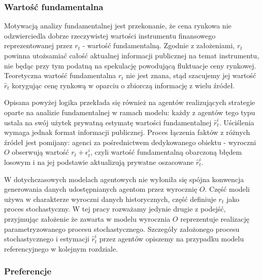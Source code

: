 {\subsubsection{Wartość fundamentalna}
Motywacją analizy fundamentalnej jest przekonanie, że cena rynkowa nie odzwierciedla dobrze rzeczywistej wartości instrumentu finansowego reprezentowanej przez $r_t$ - wartość fundamentalną. Zgodnie z założeniami, $r_t$ powinna utożsamiać całość aktualnej informacji publicznej na temat instrumentu, nie będąc przy tym podatną na spekulację powodującą fluktuacje ceny rynkowej. Teoretyczna wartość fundamentalna $r_t$ nie jest znana, stąd szacujemy jej wartość $\hat{r}_t$ korygując cenę rynkową w oparciu o zbiorczą informację z wielu źródeł.

Opisana powyżej logika przekłada się również na agentów realizujących strategie oparte na analizie fundamentalnej w ramach modelu: każdy z agentów tego typu ustala na swój użytek prywatną estymatę wartości fundamentalnej $\hat{r}^i_t$. Uściślenia wymaga jednak format informacji publicznej. Proces łączenia faktów z różnych źródeł jest pomijany: agenci za pośrednictwem dedykowanego obiektu - wyroczni $O$ obserwują wartość $r_t + \epsilon^i_t$, czyli wartość fundamentalną obarczoną błędem losowym i na jej podstawie aktualizują prywatne oszacowane $\hat{r}^i_t$.

W dotychczasowych modelach agentowych nie wyłoniła się spójna konwencja generowania danych udostępnianych agentom przez wyrocznię $O$. Część modeli używa w charakterze wyroczni danych historycznych, część definiuje $r_t$ jako proces stochastyczny. W tej pracy rozważamy jedynie drugie z podejść, przyjmując założenie że zawarta w modelu wyrocznia $O$ reprezentuje realizację parametryzowanego procesu stochastycznego. Szczegóły założonego procesu stochastycznego i estymacji $\hat{r}^i_t$ przez agentów opiszemy na przypadku modelu referencyjnego w kolejnym rozdziale.

\subsubsection{Preferencje}\label{sec:preferences}

}
